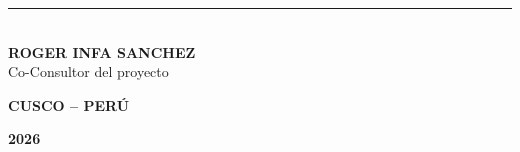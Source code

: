 \begin{titlepage}
    \vspace{1.5cm}

    \hfill
    \begin{minipage}{0.45\textwidth}
        \centering
        \rule{6cm}{0.5pt}\\
        \vspace{0.2cm}
        \textbf{ROGER INFA SANCHEZ}\\
        \small Co-Consultor del proyecto
    \end{minipage}
    \hfill

    \vfill
    
    {\large \textbf{CUSCO -- PERÚ}\par}
    {\large \textbf{2026}\par}
    \vspace{0.3cm}

\end{titlepage}

